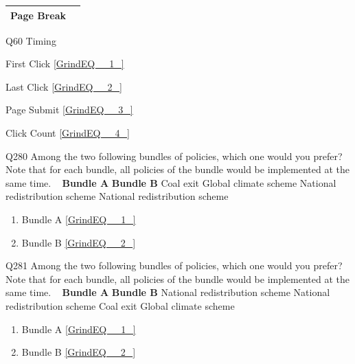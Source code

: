 \documentclass{article} %
\begin{document}
\noindent 

\noindent 

\begin{tabular}{|p{0.6in}|p{3.8in}|} \hline 
Page Break &  \\ \hline 
\end{tabular}

\eject 

\noindent 

\noindent Q60 Timing

\noindent First Click  \eqref{GrindEQ__1_}

\noindent Last Click  \eqref{GrindEQ__2_}

\noindent Page Submit  \eqref{GrindEQ__3_}

\noindent Click Count  \eqref{GrindEQ__4_}

\noindent 

\noindent 

\noindent 

\noindent Q280 Among the two following bundles of policies, which one would you prefer?  Note that for each bundle, all policies of the bundle would be implemented at the same time. ~          \textbf{Bundle A}    \textbf{Bundle B}          Coal exit    Global climate scheme          National redistribution scheme    National redistribution scheme       

\begin{enumerate}
\item  Bundle A  \eqref{GrindEQ__1_} 

\item  Bundle B  \eqref{GrindEQ__2_} 
\end{enumerate}

\noindent 

\noindent 

\noindent 

\noindent Q281 Among the two following bundles of policies, which one would you prefer?  Note that for each bundle, all policies of the bundle would be implemented at the same time. ~          \textbf{Bundle A}    \textbf{Bundle B}          National redistribution scheme    National redistribution scheme              Coal exit              Global climate scheme       

\begin{enumerate}
\item  Bundle A  \eqref{GrindEQ__1_} 

\item  Bundle B  \eqref{GrindEQ__2_} 
\end{enumerate}
\end{document}
